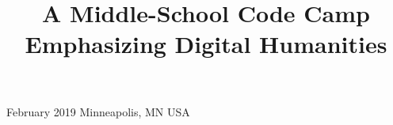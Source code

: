 



  {February 2019}
  {Minneapolis, MN USA} 



\newenvironment{blockquoteA}
{\par\noindent\ignorespaces\slshape }
{\par\noindent\ignorespacesafterend}

\newenvironment{blockquoteB}
{\begingroup\addtolength\leftmargin{-0.2in}\begin{quote}\slshape}
{\end{quote}\endgroup}

\newenvironment{blockquote}{%
  \list{} {
    \leftmargin0.2in
    \rightmargin\leftmargin
  }
  \slshape
  \item\relax}
{\endlist}


\title{A Middle-School Code Camp Emphasizing Digital Humanities}
